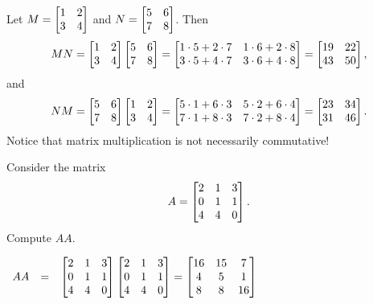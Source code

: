 \begin{exa}
Let $M = \begin{bmatrix}1 & 2  \cr 3 & 4\cr\end{bmatrix}$ and $N =
\begin{bmatrix}5 & 6  \cr 7& 8 \cr \end{bmatrix}$. Then
$$MN =\begin{bmatrix}1 & 2  \cr 3 & 4\cr\end{bmatrix}\begin{bmatrix}5 & 6  \cr 7& 8 \cr \end{bmatrix}
= \begin{bmatrix} 1\cdot 5 + 2\cdot 7 &  1\cdot 6 + 2\cdot 8 \cr
3\cdot 5 + 4\cdot 7 & 3\cdot 6 + 4 \cdot 8 \cr\end{bmatrix} =
\begin{bmatrix}19 & 22  \cr 43 & 50 \cr \end{bmatrix},$$ and
$$NM =
\begin{bmatrix}5 & 6  \cr 7& 8 \cr
\end{bmatrix}\begin{bmatrix}1 & 2  \cr 3 & 4\cr\end{bmatrix}=
\begin{bmatrix}5\cdot 1 + 6\cdot 3 &  5\cdot 2 + 6\cdot 4 \cr 7\cdot 1 + 8\cdot 3 & 7\cdot 2 + 8\cdot 4\cr
\end{bmatrix} = \begin{bmatrix}23 & 34  \cr 31& 46 \cr \end{bmatrix}.$$
Notice that matrix multiplication is not necessarily commutative!
\end{exa}

\begin{exer}
Consider the matrix
$$A = \begin{bmatrix} 2 & 1 & 3 \cr
 0 & 1 & 1 \cr
  4 & 4 & 0 \cr
  \end{bmatrix}.$$ 
Compute $AA$.
\vspace*{1.25in}
\begin{answer}
 $\begin{array}{llll}AA & = &
\begin{bmatrix} 2 & 1 & 3 \cr
 0 & 1 & 1 \cr
  4 & 4 & 0 \cr
  \end{bmatrix}\begin{bmatrix} 2 & 1 & 3 \cr
 0 & 1 & 1 \cr
  4 & 4 & 0 \cr
  \end{bmatrix} \vspace{2mm}
   =  \begin{bmatrix} 16 & 15 & 7 \cr
 4 & 5 & 1 \cr
  8 & 8 & 16 \cr
  \end{bmatrix}
 \end{array} $
\end{answer}
\end{exer}

